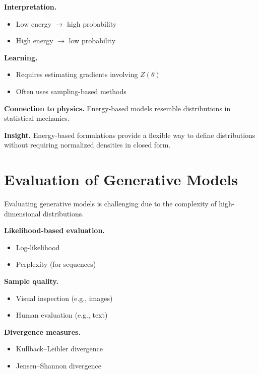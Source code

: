 \medskip

\noindent
\textbf{Interpretation.}
\begin{itemize}
    \item Low energy $\rightarrow$ high probability
    \item High energy $\rightarrow$ low probability
\end{itemize}

\medskip

\noindent
\textbf{Learning.}
\begin{itemize}
    \item Requires estimating gradients involving $Z(\theta)$
    \item Often uses sampling-based methods
\end{itemize}

\medskip

\noindent
\textbf{Connection to physics.}  
Energy-based models resemble distributions in statistical mechanics.

\medskip

\noindent
\textbf{Insight.}  
Energy-based formulations provide a flexible way to define distributions without requiring normalized densities in closed form.

\section{Evaluation of Generative Models}

Evaluating generative models is challenging due to the complexity of high-dimensional distributions.

\medskip

\noindent
\textbf{Likelihood-based evaluation.}
\begin{itemize}
    \item Log-likelihood
    \item Perplexity (for sequences)
\end{itemize}

\medskip

\noindent
\textbf{Sample quality.}
\begin{itemize}
    \item Visual inspection (e.g., images)
    \item Human evaluation (e.g., text)
\end{itemize}

\medskip

\noindent
\textbf{Divergence measures.}
\begin{itemize}
    \item Kullback--Leibler divergence
    \item Jensen--Shannon divergence
\end{itemize}

